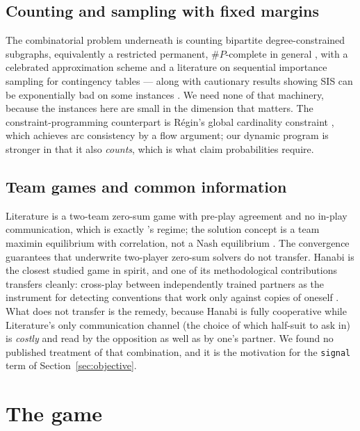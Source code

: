 \documentclass[11pt,letterpaper]{article}
\begin{document}
\subsection{Counting and sampling with fixed margins}
 The combinatorial problem
underneath is counting bipartite degree-constrained subgraphs, equivalently a
restricted permanent, $\#P$-complete in general \citep{valiant1979complexity},
with a celebrated approximation scheme \citep{jerrum2004polynomial} and a
literature on sequential importance sampling for contingency tables
\citep{chen2005sequential} --- along with cautionary results showing SIS can be
exponentially bad on some instances \citep{bezakova2012negative}. We need none
of that machinery, because the instances here are small in the dimension that
matters. The constraint-programming counterpart is R\'egin's global cardinality
constraint \citep{regin1996generalized}, which achieves arc consistency by a
flow argument; our dynamic program is stronger in that it also \emph{counts},
which is what claim probabilities require.

\subsection{Team games and common information}
 Literature is a two-team zero-sum
game with pre-play agreement and no in-play communication, which is exactly
\citeauthor{celli2018computational}'s regime; the solution concept is a team
maximin equilibrium with correlation, not a Nash equilibrium
\citep{vonstengel1997team,celli2018computational}. The convergence guarantees
that underwrite two-player zero-sum solvers do not transfer. Hanabi
\citep{bard2020hanabi} is the closest studied game in spirit, and one of its
methodological contributions transfers cleanly: cross-play between
independently trained partners as the instrument for detecting conventions that
work only against copies of oneself \citep{hu2020otherplay}. What does not
transfer is the remedy, because Hanabi is fully cooperative while Literature's
only communication channel (the choice of which half-suit to ask in) is
\emph{costly} and read by the opposition as well as by one's partner. We found
no published treatment of that combination, and it is the motivation for the
\texttt{signal} term of Section~\ref{sec:objective}.

\section{The game}
\label{sec:game}
\end{document}
